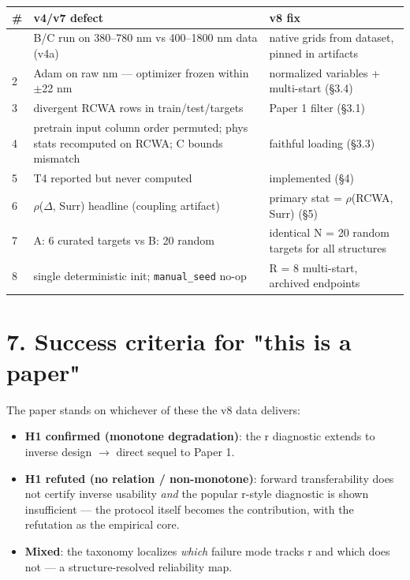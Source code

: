 \documentclass[11pt,a4paper]{article}
\newcounter{none}   %
\providecommand{\tightlist}{\setlength{\itemsep}{0pt}\setlength{\parskip}{0pt}}
\begin{document}
\begingroup
\setlength{\tabcolsep}{2pt}\tiny
{}
\label{tab:5}
{\def\LTcaptype{none} %
\begin{longtable}[]{@{}lll@{}}
\toprule\noalign{}
\# & v4/v7 defect & v8 fix \\
\midrule\noalign{}
\endhead
\bottomrule\noalign{}
\endlastfoot
1 & B/C run on 380--780 nm vs 400--1800 nm data (v4a) & native grids from dataset, pinned in artifacts \\
2 & Adam on raw nm --- optimizer frozen within \ensuremath{\pm}22 nm & normalized variables + multi-start (\S{}3.4) \\
3 & divergent RCWA rows in train/test/targets & Paper 1 filter (\S{}3.1) \\
4 & pretrain input column order permuted; phys stats recomputed on RCWA; C bounds mismatch & faithful loading (\S{}3.3) \\
5 & T4 reported but never computed & implemented (\S{}4) \\
6 & \ensuremath{\rho}(\ensuremath{\Delta}, Surr) headline (coupling artifact) & primary stat = \ensuremath{\rho}(RCWA, Surr) (\S{}5) \\
7 & A: 6 curated targets vs B: 20 random & identical N = 20 random targets for all structures \\
8 & single deterministic init; \texttt{manual\_seed} no-op & R = 8 multi-start, archived endpoints \\
\end{longtable}
}
\endgroup

\section*{7. Success criteria for "this is a paper"}

The paper stands on whichever of these the v8 data delivers:

\begin{itemize}
\tightlist
\item
  \textbf{H1 confirmed (monotone degradation)}: the r diagnostic extends to
  inverse design \ensuremath{\rightarrow} direct sequel to Paper 1.
\item
  \textbf{H1 refuted (no relation / non-monotone)}: forward transferability does
  not certify inverse usability \emph{and} the popular r-style diagnostic is shown
  insufficient --- the protocol itself becomes the contribution, with the
  refutation as the empirical core.
\item
  \textbf{Mixed}: the taxonomy localizes \emph{which} failure mode tracks r and which
  does not --- a structure-resolved reliability map.
\end{itemize}
\end{document}

